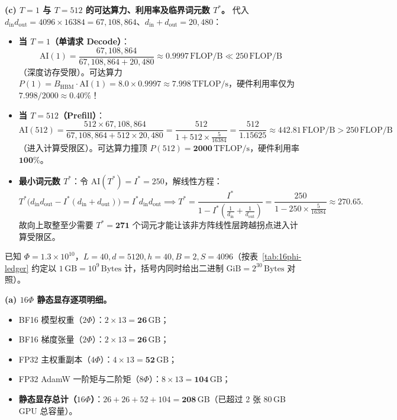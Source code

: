 \textbf{(c) $T = 1$ 与 $T = 512$ 的可达算力、利用率及临界词元数 $T^*$。} 代入 $d_{\mathrm{in}} d_{\mathrm{out}} = 4096 \times 16384 = 67{,}108{,}864$、$d_{\mathrm{in}} + d_{\mathrm{out}} = 20{,}480$：
\begin{itemize}
  \item \textbf{当 $T = 1$（单请求 Decode）}：
  \[
    \mathrm{AI}(1) = \frac{67{,}108{,}864}{67{,}108{,}864 + 20{,}480} \approx \mathbf{0.9997\,\mathrm{FLOP/B}} \ll 250\,\mathrm{FLOP/B}
  \]
  （深度访存受限）。可达算力 $P(1) = B_{\mathrm{HBM}} \cdot \mathrm{AI}(1) = 8.0 \times 0.9997 \approx \mathbf{7.998\,\mathrm{TFLOP/s}}$，硬件利用率仅为 $7.998 / 2000 \approx \mathbf{0.40\%}$！
  \item \textbf{当 $T = 512$（Prefill）}：
  \[
    \mathrm{AI}(512) = \frac{512 \times 67{,}108{,}864}{67{,}108{,}864 + 512 \times 20{,}480}
    = \frac{512}{1 + 512 \times \frac{5}{16384}} = \frac{512}{1.15625} \approx \mathbf{442.81\,\mathrm{FLOP/B}} > 250\,\mathrm{FLOP/B}
  \]
  （进入计算受限区）。可达算力撞顶 $P(512) = \mathbf{2000\,\mathrm{TFLOP/s}}$，硬件利用率 $\mathbf{100\%}$。
  \item \textbf{最小词元数 $T^*$}：令 $\mathrm{AI}(T^*) = I^* = 250$，解线性方程：
  \[
    T^*\big(d_{\mathrm{in}} d_{\mathrm{out}} - I^*(d_{\mathrm{in}} + d_{\mathrm{out}})\big) = I^* d_{\mathrm{in}} d_{\mathrm{out}}
    \implies
    T^* = \frac{I^*}{1 - I^*\left(\frac{1}{d_{\mathrm{in}}} + \frac{1}{d_{\mathrm{out}}}\right)}
    = \frac{250}{1 - 250 \times \frac{5}{16384}}
    \approx \mathbf{270.65}.
  \]
  故向上取整至少需要 $T^* = \mathbf{271}$ 个词元才能让该非方阵线性层跨越拐点进入计算受限区。
\end{itemize}


已知 $\Phi = 1.3 \times 10^{10}$，$L = 40, d = 5120, h = 40, B = 2, S = 4096$（按表~\ref{tab:16phi-ledger} 约定以 $1\,\mathrm{GB} = 10^9\,\mathrm{Bytes}$ 计，括号内同时给出二进制 $\mathrm{GiB} = 2^{30}\,\mathrm{Bytes}$ 对照）。

\textbf{(a) $16\Phi$ 静态显存逐项明细。}
\begin{itemize}
  \item BF16 模型权重（$2\Phi$）：$2 \times 13 = \mathbf{26\,\mathrm{GB}}$；
  \item BF16 梯度张量（$2\Phi$）：$2 \times 13 = \mathbf{26\,\mathrm{GB}}$；
  \item FP32 主权重副本（$4\Phi$）：$4 \times 13 = \mathbf{52\,\mathrm{GB}}$；
  \item FP32 AdamW 一阶矩与二阶矩（$8\Phi$）：$8 \times 13 = \mathbf{104\,\mathrm{GB}}$；
  \item \textbf{静态显存总计（$16\Phi$）}：$26 + 26 + 52 + 104 = \mathbf{208\,\mathrm{GB}}$（已超过 2 张 80\,GB GPU 总容量）。
\end{itemize}

